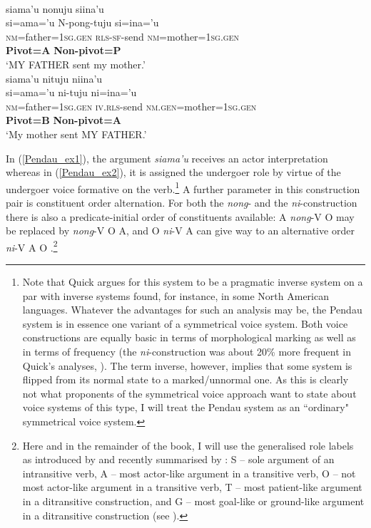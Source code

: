 \ea 
{}\\
\ea \label{Pendau_ex1}
\gllll siama'u nonuju siina'u \\
si=ama='u N-pong-tuju si=ina='u \\
 \textsc{nm}=father=\textsc{1}\textsc{sg}.\textsc{gen} \textsc{rls}-\textsc{sf}-send \textsc{nm}=mother=\textsc{1}\textsc{sg}.\textsc{gen} \\
 \textbf{Pivot=A} {} \textbf{Non-pivot=P} \\
\glft `MY FATHER sent my mother.' \\ 
\ex \label{Pendau_ex2}
\gllll siama'u nituju niina'u \\
si=ama='u ni-tuju ni=ina='u \\
 \textsc{nm}=father=\textsc{1}\textsc{sg}.\textsc{gen} \textsc{iv}.\textsc{rls}-send \textsc{nm}.\textsc{gen}=mother=\textsc{1}\textsc{sg}.\textsc{gen} \\
 \textbf{Pivot=B} {} \textbf{Non-pivot=A} \\
\glft `My mother sent MY FATHER.'\\ 
\z
\z

In (\ref{Pendau_ex1}), the argument \textit{siama'u} receives an actor interpretation whereas in (\ref{Pendau_ex2}), it is assigned the undergoer role by virtue of the undergoer voice formative on the verb.\footnote{Note that Quick argues for this system to be a pragmatic inverse system on a par with inverse systems found, for instance, in some North American languages. Whatever the advantages for such an analysis may be, the Pendau system is in essence one variant of a symmetrical voice system. Both voice constructions are equally basic in terms of morphological marking as well as in terms of frequency (the \textit{ni}-construction was about 20\% more frequent in Quick's analyses, \citealt[580]{Quick2007}). The term inverse, however, implies that some system is flipped from its normal state to a marked/unnormal one. As this is clearly not what proponents of the symmetrical voice approach want to state about voice systems of this type, I will treat the Pendau system as an ``ordinary" symmetrical voice system.} A further parameter in this construction pair is constituent order alternation. For both the \textit{nong}- and the \textit{ni}-construction there is also a predicate-initial order of constituents available: A \textit{nong}-V O may be replaced by \textit{nong}-V O A, and O \textit{ni}-V A can give way to an alternative order \textit{ni}-V A O \citep[366]{Quick2007}.\footnote{Here and in the remainder of the book, I will use the generalised role labels as introduced by \textcite{Dixon1979} and recently summarised by \textcite{Bickel2011}: S -- sole argument of an intransitive verb, A -- most actor-like argument in a transitive verb, O -- not most actor-like argument in a transitive verb, T -- most patient-like argument in a ditransitive construction, and G -- most goal-like or ground-like argument in a ditransitive construction (see \citealt[402ff.]{Bickel2011}).}


